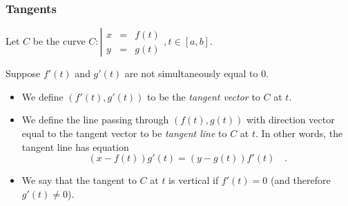 \begin{frame}
\frametitle{Tangents}
Let $C $ be the curve $C:\left|\begin{array}{rcl}x&=&f(t)\\y&=&g(t)\end{array} \right., t\in [a,b]$.
\begin{definition}
Suppose \alert<4,5>{ $f'(t)$ and $g'(t)$ are not simultaneously equal to $0$.} 
\begin{itemize}
\item  We define $(f'(t), g'(t))$ to be the \emph{tangent vector} to $C$ at $t$.
\item<2->  We define the line passing through $(f(t), g(t))$ with direction vector equal to the tangent vector to be \emph{tangent line} to $C$ at $t$. In other words, the tangent line has equation
\[
(x-f(t))g'(t) =(y-g(t))f'(t)\quad .
\]
\item<3->  We say that the tangent to $C$ at $t$ is vertical if $f'(t)=0$ (\alert<4>{and therefore $g'(t)\neq 0$}).
\end{itemize}
\end{definition}
\end{frame}
\begin{frame}
\begin{example}

\end{example}
\end{frame}

